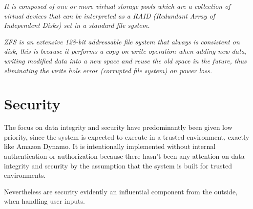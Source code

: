\begin{definition}[ZFS] \label{def:zfs}
\textit{It is composed of one or more virtual storage pools which are a collection of virtual devices that can be interpreted as a RAID (Redundant Array of Independent Disks) set in a standard file system.}
\newline

\textit{ZFS is an extensive 128-bit addressable file system that always is consistent on disk, this is because it performs a copy on write operation when adding new data, \ie writing modified data into a new space and reuse the old space in the future, thus eliminating the write hole error (corrupted file system) \eg on power loss.}
\end{definition}
\vspace*{2mm}

\section{Security} \label{sec:security}
The focus on data integrity and security have predominantly been given low priority, since the system is expected to execute in a trusted environment, exactly like Amazon Dynamo. It is intentionally implemented without internal authentication or authorization because there hasn't been any attention on data integrity and security by the assumption that the system is built for trusted environments.
\newline

Nevertheless are security evidently an influential component from the outside, when handling user inputs.
